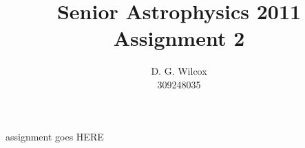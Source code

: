 \documentclass[10pt,a4paper]{article}
\title{Senior Astrophysics 2011 Assignment 2}
\date{}
\author{D. G. Wilcox \\
		309248035}
\begin{document}
\maketitle
assignment goes HERE
\end{document}

